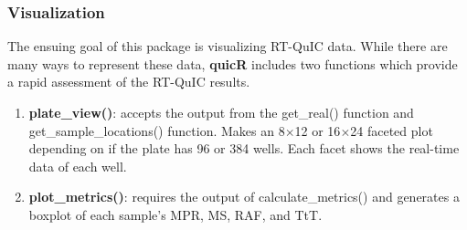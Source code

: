 \documentclass[preprint,12pt,a4paper]{elsarticle}
\providecommand{\DIFdeltex}[1]{{\protect\color{red}\sout{#1}}} %
\providecommand{\DIFdelbegin}{} %
\providecommand{\DIFdelend}{} %
\providecommand{\DIFdel}[1]{\texorpdfstring{\DIFdeltex{#1}}{}} %
\begin{document}
            \subsubsection{Visualization}
                The ensuing goal of this package is visualizing RT-QuIC data. While there are many ways to represent these data, \textbf{quicR} includes two functions which provide a rapid assessment of the RT-QuIC results.
                \begin{enumerate}
                    \item \textbf{plate\_view()}: accepts the output from the get\_real() function and get\_sample\_locations() function. Makes an 8$\times$12 or 16$\times$24 faceted plot depending on if the plate has 96 or 384 wells. Each facet shows the real-time data of each well.
                    \item \textbf{plot\_metrics()}: requires the output of calculate\_metrics() and generates a boxplot of each sample's MPR, MS, RAF, and TtT.
                \end{enumerate}


\end{document}
